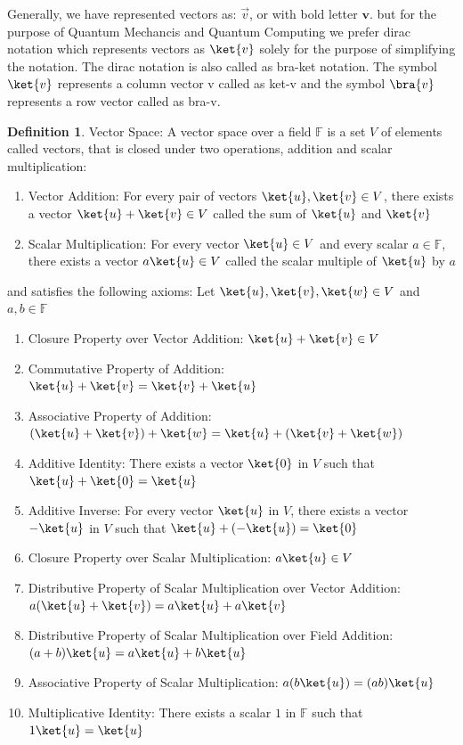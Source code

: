 \documentclass[12pt, oneside]{book}
\theoremstyle{definition}
\newtheorem{definition}{Definition}[section]
\theoremstyle{definition}
\theoremstyle{remark}
\begin{document}
Generally, we have represented vectors as: $\vec{v}$, or with bold letter $\mathbf{v}$. but for the 
purpose of Quantum Mechancis and Quantum Computing we prefer dirac notation which represents vectors as $\ket{v}$ 
solely for the purpose of simplifying the notation. The dirac notation is also called as bra-ket notation. The 
symbol $\ket{v}$ represents a column vector v called as ket-v and the symbol $\bra{v}$ represents a 
row vector called as bra-v. 

\begin{definition}
    Vector Space: A vector space over a field $\mathbb{F}$ is a set $V$ of elements called vectors, that is closed
    under two operations, addition and scalar multiplication:
    \begin{enumerate}
        \item Vector Addition: For every pair of vectors $\ket{u},\ket{v}\in V$, there exists a vector $\ket{u}+\ket{v}\in V$ called the sum of $\ket{u}$ and $\ket{v}$
        \item Scalar Multiplication: For every vector $\ket{u}\in V$ and every scalar $a\in\mathbb{F}$, there exists a vector $a\ket{u}\in V$ called the scalar multiple of $\ket{u}$ by $a$
    \end{enumerate}
    and satisfies the following axioms:
    Let $\ket{u},\ket{v},\ket{w}\in V$ and $a,b\in\mathbb{F}$
    \label{def:Axioms of Vector Space}
    \begin{enumerate}
        \item Closure Property over Vector Addition: $\ket{u}+\ket{v}\in V$
        \item Commutative Property of Addition: $\ket{u}+\ket{v}=\ket{v}+\ket{u}$
        \item Associative Property of Addition: $(\ket{u}+\ket{v})+\ket{w}=\ket{u}+(\ket{v}+\ket{w})$
        \item Additive Identity: There exists a vector $\ket{0}$ in $V$ such that $\ket{u}+\ket{0}=\ket{u}$
        \item Additive Inverse: For every vector $\ket{u}$ in $V$, there exists a vector $-\ket{u}$ in $V$ such that $\ket{u}+(-\ket{u})=\ket{0}$
        \item Closure Property over Scalar Multiplication: $a\ket{u}\in V$
        \item Distributive Property of Scalar Multiplication over Vector Addition: $a(\ket{u}+\ket{v})=a\ket{u}+a\ket{v}$
        \item Distributive Property of Scalar Multiplication over Field Addition: $(a+b)\ket{u}=a\ket{u}+b\ket{u}$
        \item Associative Property of Scalar Multiplication: $a(b\ket{u})=(ab)\ket{u}$
        \item Multiplicative Identity: There exists a scalar $1$ in $\mathbb{F}$ such that $1\ket{u}=\ket{u}$
    \end{enumerate}
\end{definition}
\end{document}
